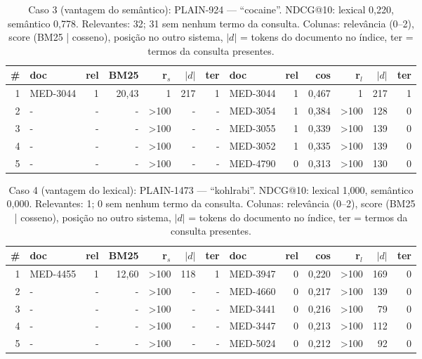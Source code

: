 \begin{table}[!htb]
\centering
\caption{Caso 3 (vantagem do semântico): PLAIN-924 --- ``cocaine''. NDCG@10: lexical 0,220, semântico 0,778. Relevantes: 32; 31 sem nenhum termo da consulta. Colunas: relevância (0--2), score (BM25 | cosseno), posição no outro sistema, $|d|$ = tokens do documento no índice, ter = termos da consulta presentes.}
\label{tab:case3}
\scriptsize
\begin{tabular}{rlrrrrr|lrrrrr}
\toprule
\# & doc & rel & BM25 & r$_s$ & $|d|$ & ter & doc & rel & cos & r$_l$ & $|d|$ & ter \\
\midrule
1 & MED-3044 & 1 & 20,43 & 1 & 217 & 1 & MED-3044 & 1 & 0,467 & 1 & 217 & 1 \\
2 & - & - & - & >100 & - & - & MED-3054 & 1 & 0,384 & >100 & 128 & 0 \\
3 & - & - & - & >100 & - & - & MED-3055 & 1 & 0,339 & >100 & 139 & 0 \\
4 & - & - & - & >100 & - & - & MED-3052 & 1 & 0,335 & >100 & 139 & 0 \\
5 & - & - & - & >100 & - & - & MED-4790 & 0 & 0,313 & >100 & 130 & 0 \\
\bottomrule
\end{tabular}
\end{table}
\begin{table}[!htb]
\centering
\caption{Caso 4 (vantagem do lexical): PLAIN-1473 --- ``kohlrabi''. NDCG@10: lexical 1,000, semântico 0,000. Relevantes: 1; 0 sem nenhum termo da consulta. Colunas: relevância (0--2), score (BM25 | cosseno), posição no outro sistema, $|d|$ = tokens do documento no índice, ter = termos da consulta presentes.}
\label{tab:case4}
\scriptsize
\begin{tabular}{rlrrrrr|lrrrrr}
\toprule
\# & doc & rel & BM25 & r$_s$ & $|d|$ & ter & doc & rel & cos & r$_l$ & $|d|$ & ter \\
\midrule
1 & MED-4455 & 1 & 12,60 & >100 & 118 & 1 & MED-3947 & 0 & 0,220 & >100 & 169 & 0 \\
2 & - & - & - & >100 & - & - & MED-4660 & 0 & 0,217 & >100 & 139 & 0 \\
3 & - & - & - & >100 & - & - & MED-3441 & 0 & 0,216 & >100 & 79 & 0 \\
4 & - & - & - & >100 & - & - & MED-3447 & 0 & 0,213 & >100 & 112 & 0 \\
5 & - & - & - & >100 & - & - & MED-5024 & 0 & 0,212 & >100 & 92 & 0 \\
\bottomrule
\end{tabular}
\end{table}
